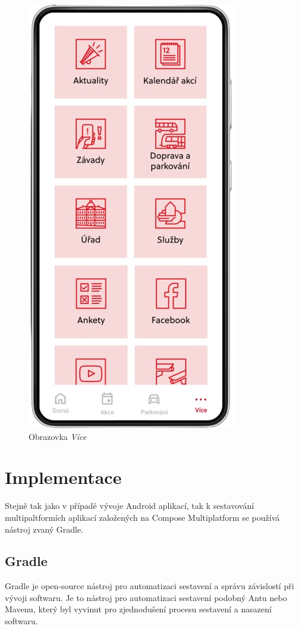 \begin{minipage}[t]{0.45\textwidth}
\begin{figure}[H]
    \includegraphics[width=.6\textwidth]{screen4.png}
    \caption{Obrazovka \textit{Více}}
    \label{fig:mockup4}
  \end{figure}
\end{minipage}

\chapter{Implementace}
Stejně tak jako v případě vývoje Android aplikací, tak k sestavování multipaltformích aplikací založených na Compose Multiplatform 
se používá nástroj zvaný Gradle.  

\section{Gradle} \label{gradleChapter}
Gradle je open-source nástroj pro automatizaci sestavení a správu závislostí při vývoji softwaru. Je to nástroj pro automatizaci sestavení 
podobný Antu nebo Mavenu, který byl vyvinut pro zjednodušení procesu sestavení a nasazení softwaru.

